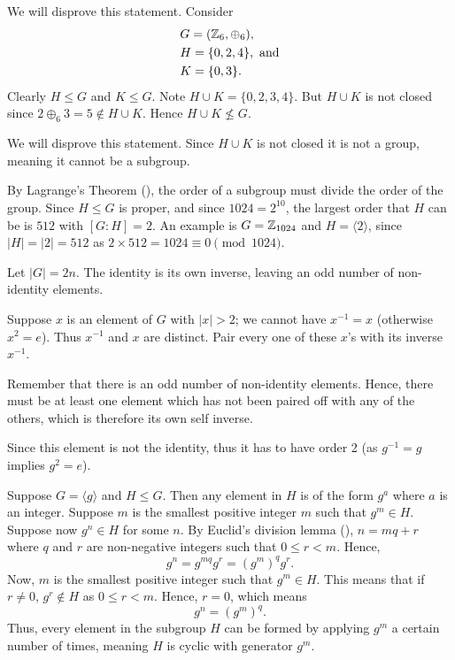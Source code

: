 \begin{questions}
\begin{partquestions}{\alph*}
        \item We will disprove this statement. Consider
        \begin{align*}
            &G = (\mathbb{Z}_6, \oplus_6),\\
            &H = \{0, 2, 4\},\text{ and}\\
            &K = \{0, 3\}.
        \end{align*}
        Clearly $H \leq G$ and $K \leq G$. Note $H \cup K = \{0, 2, 3, 4\}$. But $H \cup K$ is not closed since $2 \oplus_6 3 = 5 \not \in H \cup K$. Hence $H \cup K \not\leq G$.

        \item We will disprove this statement. Since $H \cup K$ is not closed it is not a group, meaning it cannot be a subgroup.
    \end{partquestions}

    \item By Lagrange's Theorem (), the order of a subgroup must divide the order of the group. Since $H \leq G$ is proper, and since $1024 = 2^{10}$, the largest order that $H$ can be is $512$ with $[G:H] = 2$. An example is $G = \mathbb{Z}_{1024}$ and $H = \langle 2 \rangle$, since $|H| = |2| = 512$ as $2 \times 512 = 1024 \equiv 0 \pmod{1024}$.

    \item Let $|G| = 2n$. The identity is its own inverse, leaving an odd number of non-identity elements.

    Suppose $x$ is an element of $G$ with $|x| > 2$; we cannot have $x^{-1} = x$ (otherwise $x^2 = e$). Thus $x^{-1}$ and $x$ are distinct. Pair every one of these $x$'s with its inverse $x^{-1}$.

    Remember that there is an odd number of non-identity elements. Hence, there must be at least one element which has not been paired off with any of the others, which is therefore its own self inverse.

    Since this element is not the identity, thus it has to have order 2 (as $g^{-1} = g$ implies $g^2 = e$).

    \item Suppose $G = \langle g \rangle$ and $H \leq G$. Then any element in $H$ is of the form $g^a$ where $a$ is an integer. Suppose $m$ is the smallest positive integer $m$ such that $g^m \in H$. Suppose now $g^n \in H$ for some $n$. By Euclid's division lemma (), $n = mq + r$ where $q$ and $r$ are non-negative integers such that $0 \leq r < m$. Hence,
    \[
        g^n = g^{mq}g^r = (g^m)^q g^r.
    \]
    Now, $m$ is the smallest positive integer such that $g^m \in H$. This means that if $r \neq 0$, $g^r \not\in H$ as $0 \leq r < m$. Hence, $r = 0$, which means
    \[
        g^n = (g^m)^q.
    \]
    Thus, every element in the subgroup $H$ can be formed by applying $g^m$ a certain number of times, meaning $H$ is cyclic with generator $g^m$.


\end{questions}
